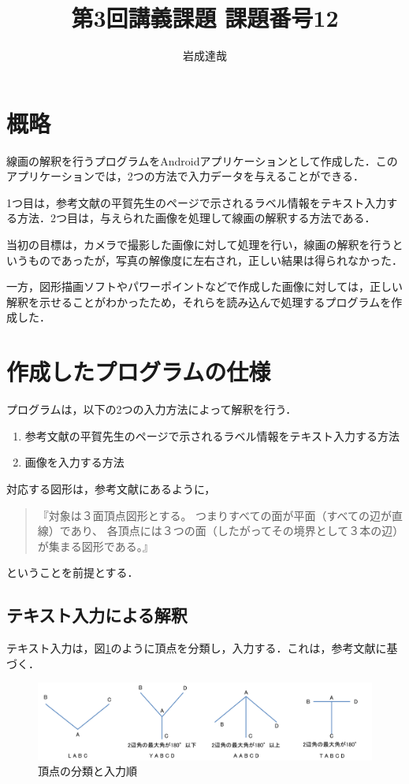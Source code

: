 \documentclass{jarticle}
\title{第3回講義課題 課題番号12}
\date{\todayd}
\author{岩成達哉}
\begin{document}
\begin{titlepage}
	\setlength{\topmargin}{1.1in}
	\vspace{100mm}
	\maketitle
\end{titlepage}


\section{概略}
線画の解釈を行うプログラムをAndroidアプリケーションとして作成した．このアプリケーションでは，2つの方法で入力データを与えることができる．

1つ目は，参考文献\cite{ref:labeling}の平賀先生のページで示されるラベル情報をテキスト入力する方法．2つ目は，与えられた画像を処理して線画の解釈する方法である．

当初の目標は，カメラで撮影した画像に対して処理を行い，線画の解釈を行うというものであったが，写真の解像度に左右され，正しい結果は得られなかった．

一方，図形描画ソフトやパワーポイントなどで作成した画像に対しては，正しい解釈を示せることがわかったため，それらを読み込んで処理するプログラムを作成した．


\section{作成したプログラムの仕様}
プログラムは，以下の2つの入力方法によって解釈を行う．
\begin{enumerate}
\item 参考文献\cite{ref:labeling}の平賀先生のページで示されるラベル情報をテキスト入力する方法
\item 画像を入力する方法
\end{enumerate}

対応する図形は，参考文献\cite{ref:labeling}にあるように，
\begin{quote}
『対象は３面頂点図形とする。
つまりすべての面が平面（すべての辺が直線）であり、 各頂点には３つの面（したがってその境界として３本の辺）が集まる図形である。』
\end{quote}
ということを前提とする．


\subsection{テキスト入力による解釈}
テキスト入力は，図\ref{fig:labeling}のように頂点を分類し，入力する．これは，参考文献\cite{ref:labeling}に基づく．
\begin{figure}[H]
\begin{center}
\includegraphics[width=180mm]{image/labeling.png}
\caption{頂点の分類と入力順}
\label{fig:labeling}
\end{center}
\end{figure}
\end{document}
